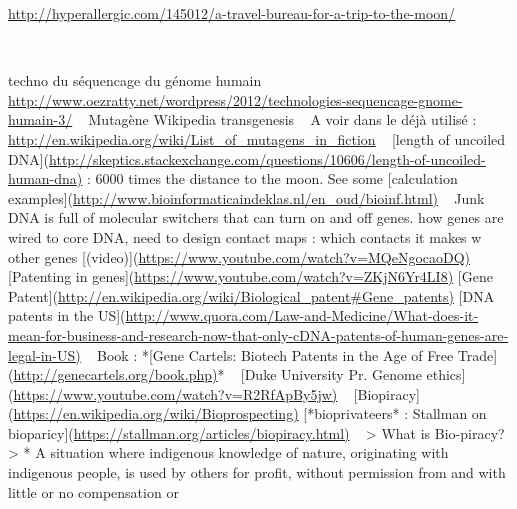 \url{http://hyperallergic.com/145012/a-travel-bureau-for-a-trip-to-the-moon/}

~
~

\bigskip

techno du s\'equencage du g\'enome humain~
\url{http://www.oezratty.net/wordpress/2012/technologies-sequencage-gnome-humain-3/}
~
Mutag\`ene
Wikipedia
transgenesis
~
A voir dans le d\'ej\`a utilis\'e :
~~~ \url{http://en.wikipedia.org/wiki/List_of_mutagens_in_fiction}
~
[length of uncoiled
DNA](\url{http://skeptics.stackexchange.com/questions/10606/length-of-uncoiled-human-dna)}
: 6000 times the distance to the moon. See some [calculation
examples](\url{http://www.bioinformaticaindeklas.nl/en_oud/bioinf.html)}
~
{\textquotedbl}Junk DNA{\textquotedbl} is full of molecular switchers
that can turn on and off genes. how genes are wired to core DNA, need
to design contact maps : {\textquotedbl}which contacts it makes w other
genes{\textquotedbl}
[(video)](\url{https://www.youtube.com/watch?v=MQeNgocaoDQ)}
~
[Patenting in genes](\url{https://www.youtube.com/watch?v=ZKjN6Yr4LI8)}
[Gene
Patent](\url{http://en.wikipedia.org/wiki/Biological_patent#Gene_patents)}
[DNA patents in the
US](\url{http://www.quora.com/Law-and-Medicine/What-does-it-mean-for-business-and-research-now-that-only-cDNA-patents-of-human-genes-are-legal-in-US)}
~
Book : *[Gene Cartels: Biotech Patents in the Age of Free
Trade](\url{http://genecartels.org/book.php)}*
~
[Duke University Pr. Genome
ethics](\url{https://www.youtube.com/watch?v=R2RfApBy5jw)}
~
[Biopiracy](\url{https://en.wikipedia.org/wiki/Bioprospecting)}
[*bioprivateers* : Stallman on
bioparicy](\url{https://stallman.org/articles/biopiracy.html)}
~
{\textgreater} What is Bio-piracy?
{\textgreater} * A situation where indigenous knowledge of nature,
originating with indigenous people, is used by others for profit,
without permission from and with little or no compensation or
